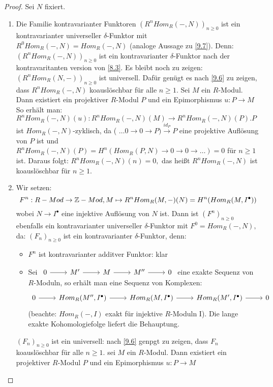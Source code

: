 \begin{proof}
	Sei $N$ fixiert. \\
	\begin{enumerate}
		\item Die Familie kontravarianter Funktoren $(R^{n}Hom_R(-,N))_{n \geq 0}$ ist ein kontravarianter universeller $\delta$-Funktor mit $ R^{0}Hom_R(-,N)= Hom_R(-,N)$ (analoge Aussage zu \ref{9.7}). Denn: $(R^{n}Hom_R(-,N))_{n \geq 0}$ ist ein  kontravarianter $\delta$-Funktor nach der kontravaritanten version von \ref{8.3}. Es bleibt noch zu zeigen: $(R^{n}Hom_R(N,-))_{n \geq 0}$ ist universell. Dafür genügt es nach \ref{9.6} zu zeigen, dass $R^{n}Hom_R(-,N)$ koauslöschbar für alle $n \geq 1$. Sei $M$ ein $R$-Modul. Dann existiert ein projektiver $R$-Modul $P$ und ein Epimorphismus $u: P \to M $
		So erhält man: $R^{n}Hom_R(-,N)(u) : R^{n}Hom_R(-,N)(M) \to R^{n}Hom_R(-,N)(P). P $ ist $Hom_R(-,N)$-zyklisch, da ( $\dots 0 \to 0 \to P) \overset{id_P}{\to} P $ eine projektive Auflösung von $P$ ist und $R^{n}Hom_R(-,N)(P) =H^{n}(Hom_R(P,N) \to 0 \to 0 \to \dots ) =0 $ für $ n \geq 1$ ist. Daraus folgt: $R^{n}Hom_R(-,N)(n) = 0,$ das heißt $R^{n}Hom_R(-,N) $ ist koauslöschbar für $n \geq 1 $. 
		\item Wir setzen: $$F^{n}: R-Mod \to \mathbb{Z}-Mod, M \mapsto R^{n}Hom_R(M,-)(N) = H^{n}(Hom_R(M,I^{\bullet}))$$ wobei $N \to I^{\bullet} $ eine injektive Auflösung von $N$ ist. Dann ist $(F^{n})_{n \geq 0} $ ebenfalls ein kontravarianter universeller $\delta$-Funktor mit $F^{0} = Hom_R(-,N),$ da:
		$(F_n)_{n \geq 0} $ ist ein kontravarianter $\delta$-Funktor, denn:
		\begin{itemize}
			\item $F^{n}$ ist kontravarianter additver Funktor: klar
			\item Sei $\begin{tikzcd}
			0\arrow{r} & M' \arrow{r} & M \arrow{r} & M'' \arrow{r} & 0
			\end{tikzcd}$ eine exakte Sequenz von $R$-Moduln, so erhält man eine Sequenz von Komplexen:$$\begin{tikzcd}
			0\arrow{r} & Hom_R(M'',I^{\bullet}) \arrow{r} & Hom_R(M,I^{\bullet})\arrow{r} & Hom_R(M', I^{\bullet}) \arrow{r} & 0
			\end{tikzcd}$$ (beachte: $Hom_R(-,I)$ exakt für injektive $R$-Moduln I). Die lange exakte Kohomologiefolge liefert die Behauptung. 
		\end{itemize}
		$(F_n)_{n \geq 0} $ ist ein universell: nach \ref{9.6} genpgt zu zeigen, dass $F_n$ koauslöschbar für alle $n \geq 1$. sei $M$ ein $R$-Modul. Dann existiert ein projektiver $R$-Modul $P$ und ein Epimorphismus $u: P \to M $ 

\end{enumerate}
\end{proof}
